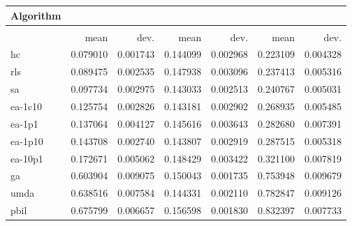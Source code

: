 \begin{tabular}{@{} l *{6}{>{{}}N{1}{2}} @{}}
\toprule
{Algorithm} &  \\
\midrule
&  &  &  \\
\midrule
& {mean} & {dev.} & {mean} & {dev.} & {mean} & {dev.} \\
\midrule
hc & 0.079010 & 0.001743 & 0.144099 & 0.002968 & 0.223109 & 0.004328 \\
rls & 0.089475 & 0.002535 & 0.147938 & 0.003096 & 0.237413 & 0.005316 \\
sa & 0.097734 & 0.002975 & 0.143033 & 0.002513 & 0.240767 & 0.005031 \\
ea-1c10 & 0.125754 & 0.002826 & 0.143181 & 0.002902 & 0.268935 & 0.005485 \\
ea-1p1 & 0.137064 & 0.004127 & 0.145616 & 0.003643 & 0.282680 & 0.007391 \\
ea-1p10 & 0.143708 & 0.002740 & 0.143807 & 0.002919 & 0.287515 & 0.005318 \\
ea-10p1 & 0.172671 & 0.005062 & 0.148429 & 0.003422 & 0.321100 & 0.007819 \\
ga & 0.603904 & 0.009075 & 0.150043 & 0.001735 & 0.753948 & 0.009679 \\
umda & 0.638516 & 0.007584 & 0.144331 & 0.002110 & 0.782847 & 0.009126 \\
pbil & 0.675799 & 0.006657 & 0.156598 & 0.001830 & 0.832397 & 0.007733 \\
\bottomrule
\end{tabular}

